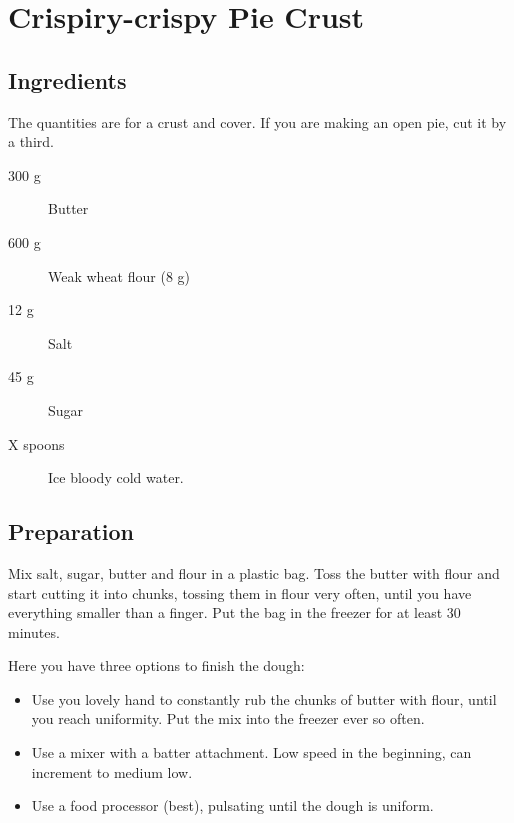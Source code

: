 \setchapterpreamble[u]{\margintoc}
\chapter{Crispiry-crispy Pie Crust}

\section{Ingredients}
The quantities are for a crust and cover. If you are making an open pie, cut it by a third.

\begin{multicols}{2}
\begin{description}
	\item[300 g] Butter
	\item[600 g] Weak wheat flour (8 g)
	\item[12 g] Salt
	\item[45 g] Sugar
	\item[X spoons] Ice bloody cold water.
\end{description}
\end{multicols}

\section{Preparation}
Mix salt, sugar, butter and flour in a plastic bag.
%
Toss the butter with flour and start cutting it into chunks, tossing them in flour very often, until you have everything smaller than a finger.
%
Put the bag in the freezer for at least $30$ minutes.

Here you have three options to finish the dough:
\begin{itemize}
	\item Use you lovely hand to constantly rub the chunks of butter with flour, until you reach uniformity. Put the mix into the freezer ever so often.
	\item Use a mixer with a batter attachment. Low speed in the beginning, can increment to medium low.
	\item Use a food processor (best), pulsating until the dough is uniform.
\end{itemize}



